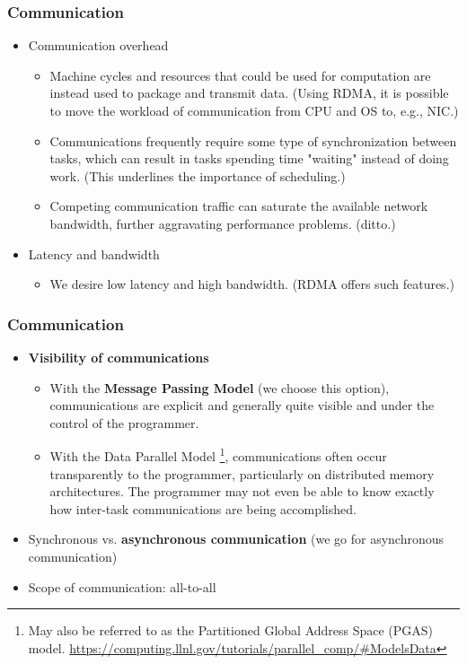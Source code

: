 \documentclass{beamer}
\begin{document}
\begin{frame}
\frametitle{Communication}

\begin{itemize}
  \item Communication overhead
    \begin{itemize}
      \item Machine cycles and resources that could be used for computation are instead used to package and transmit data. 
        \alert{(Using RDMA, it is possible to move the workload of communication from CPU and OS to, e.g., NIC.)}
      \item Communications frequently require some type of synchronization between tasks, which can result in tasks spending time "waiting" instead of doing work. 
        \alert{(This underlines the importance of scheduling.)}
      \item Competing communication traffic can saturate the available network bandwidth, further aggravating performance problems. 
        \alert{(ditto.)}
    \end{itemize}
  \item Latency and bandwidth
  \begin{itemize}
    \item We desire low latency and high bandwidth. \alert{(RDMA offers such features.)}
  \end{itemize}
\end{itemize}
    
\end{frame}

\begin{frame}
\frametitle{Communication}
  
\begin{itemize}
  \item \textbf{Visibility of communications}
    \begin{itemize}
      \item With the \textbf{Message Passing Model} \alert{(we choose this option)}, communications are explicit and generally quite visible and under the control of the programmer.        \item With the Data Parallel Model \footnote{May also be referred to as the Partitioned Global Address Space (PGAS) model. 
        \url{https://computing.llnl.gov/tutorials/parallel\_comp/\#ModelsData}}, 
        communications often occur transparently to the programmer, particularly on distributed memory architectures. 
        The programmer may not even be able to know exactly how inter-task communications are being accomplished.
    \end{itemize}
  \item Synchronous vs. \textbf{asynchronous communication} \alert{(we go for asynchronous communication)}
  \item Scope of communication: all-to-all
\end{itemize}
      
\end{frame}
\end{document}
